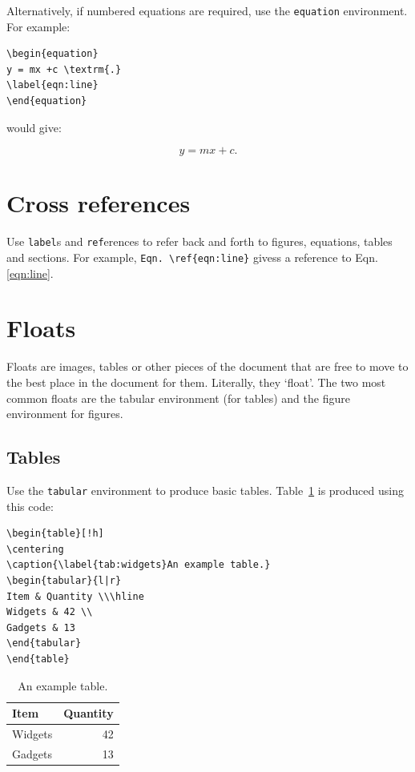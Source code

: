 \documentclass[12pt,letterpaper]{report}
\begin{document}
Alternatively, if numbered equations are required, use the \texttt{equation} environment. For example:

\begin{verbatim}
\begin{equation}
y = mx +c \textrm{.}
\label{eqn:line}
\end{equation}
\end{verbatim}

would give:

\begin{equation}
y = mx+c \textrm{.}
\label{eqn:line}
\end{equation}

\section{Cross references}
Use \texttt{label}s and \texttt{ref}erences to refer back and forth to figures, equations, tables and sections. For example, \verb+Eqn. \ref{eqn:line}+ givess a reference to Eqn. \ref{eqn:line}.

\section{Floats}
Floats are images, tables or other pieces of the document that are free to move to the best place in the document for them. Literally, they `float'. The two most common floats are the tabular environment (for tables) and the figure environment for figures.

\subsection{Tables}
Use the \texttt{tabular} environment to produce basic tables. Table~\ref{tab:widgets} is produced using this code: 

\begin{verbatim}
\begin{table}[!h]
\centering
\caption{\label{tab:widgets}An example table.}
\begin{tabular}{l|r}
Item & Quantity \\\hline
Widgets & 42 \\
Gadgets & 13
\end{tabular}
\end{table}
\end{verbatim}

\begin{table}[!h]
\centering
\caption{\label{tab:widgets}An example table.}
\begin{tabular}{l|r}
Item & Quantity \\\hline
Widgets & 42 \\
Gadgets & 13
\end{tabular}
\end{table}
\end{document}
